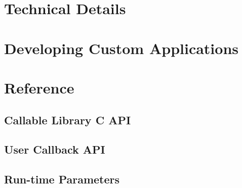 \documentclass[twoside,11pt]{book}
\begin{document}
\chapter{Technical Details}
\label{SYMPHONY-design}


\chapter{Developing Custom Applications}
\label{SYMPHONY-development}


\chapter{Reference}
\label{SYMPHONY-reference}

\section{Callable Library C API}
\label{callable-library}


\section{User Callback API}
\label{API}
\sloppy


\newpage



\newpage



\newpage



\newpage



\newpage

\section{Run-time Parameters}
\label{params}




\backmatter

\cleardoublepage
{}
{}



%


%


\cleardoublepage
{}
\printindex*
\end{document}
